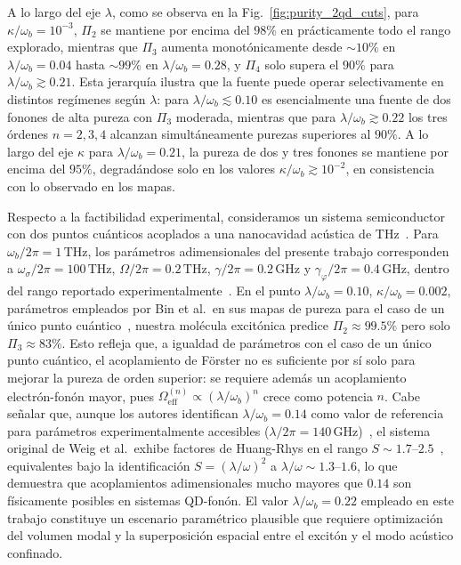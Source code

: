 A lo largo del eje $\lambda$, como se observa en la Fig.~\ref{fig:purity_2qd_cuts}, para $\kappa/\omega_b = 10^{-3}$, $\Pi_2$ se mantiene por encima del $98\%$ en prácticamente todo el rango explorado, mientras que $\Pi_3$ aumenta monotónicamente desde $\sim 10\%$ en $\lambda/\omega_b = 0.04$ hasta $\sim 99\%$ en $\lambda/\omega_b = 0.28$, y $\Pi_4$ solo supera el $90\%$ para $\lambda/\omega_b \gtrsim 0.21$. Esta jerarquía ilustra que la fuente puede operar selectivamente en distintos regímenes según $\lambda$: para $\lambda/\omega_b \lesssim 0.10$ es esencialmente una fuente de dos fonones de alta pureza con $\Pi_3$ moderada, mientras que para $\lambda/\omega_b \gtrsim 0.22$ los tres órdenes $n=2,3,4$ alcanzan simultáneamente purezas superiores al $90\%$. A lo largo del eje $\kappa$ para $\lambda/\omega_b = 0.21$, la pureza de dos y tres  fonones se mantiene por encima del $95\%$, degradándose solo en los valores $\kappa/\omega_b \gtrsim 10^{-2}$, en consistencia con lo observado en los mapas.

Respecto a la factibilidad experimental, consideramos un sistema semiconductor con dos puntos cuánticos acoplados a una nanocavidad acústica de THz~\cite{weig2004,rozas2009}. Para $\omega_b/2\pi = 1\,\mathrm{THz}$, los parámetros adimensionales del presente trabajo corresponden a $\omega_\sigma/2\pi = 100\,\mathrm{THz}$, $\Omega/2\pi = 0.2\,\mathrm{THz}$, $\gamma/2\pi = 0.2\,\mathrm{GHz}$ y $\gamma_\varphi/2\pi = 0.4\,\mathrm{GHz}$, dentro del rango reportado experimentalmente~\cite{weig2004,rozas2009,bin2020}. En el punto $\lambda/\omega_b = 0.10$, $\kappa/\omega_b = 0.002$,  parámetros empleados por Bin et al.\ en sus mapas de pureza para 
el caso de un único punto cuántico~\cite{bin2020}, nuestra molécula excitónica predice $\Pi_2 \approx 99.5\%$ pero solo $\Pi_3 \approx 83\%$. Esto refleja que, a igualdad de parámetros con el caso de un único punto cuántico, el acoplamiento de Förster no es suficiente por sí solo para mejorar la pureza de orden superior: se requiere además un acoplamiento electrón-fonón mayor, pues $\Omega_\mathrm{eff}^{(n)} \propto (\lambda/\omega_b)^n$ crece como potencia $n$. Cabe señalar que, aunque los autores identifican $\lambda/\omega_b = 0.14$ como valor de referencia para parámetros experimentalmente accesibles ($\lambda/2\pi = 140\,\mathrm{GHz}$)~\cite{bin2020}, el sistema original de Weig et al.\ exhibe factores de Huang-Rhys en el rango $S \sim 1.7$--$2.5$~\cite{weig2004}, equivalentes bajo la identificación $S = (\lambda/\omega)^2$ a $\lambda/\omega \sim 1.3$--$1.6$, lo que demuestra que acoplamientos adimensionales mucho mayores que $0.14$ son físicamente posibles en sistemas QD-fonón. El valor $\lambda/\omega_b = 0.22$ empleado en este trabajo constituye un escenario paramétrico plausible que requiere optimización del volumen modal y la superposición espacial entre el excitón y el modo acústico confinado.

